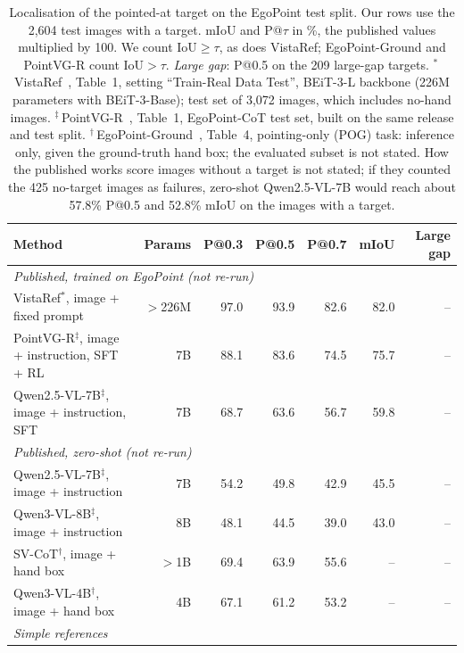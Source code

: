 \begin{table}[h]
  \caption{Localisation of the pointed-at target on the EgoPoint test split. Our rows use the 2,604 test images with a target. mIoU and P@$\tau$ in \%, the published values multiplied by 100. We count IoU${\geq}\tau$, as does VistaRef; EgoPoint-Ground and PointVG-R count IoU${>}\tau$. \emph{Large gap}: P@0.5 on the 209 large-gap targets.
  $^\ast$\,VistaRef~\cite{li2026vistaref}, Table~1, setting ``Train-Real Data Test'', BEiT-3-L backbone (226M parameters with BEiT-3-Base); test set of 3,072 images, which includes no-hand images.
  $^\ddagger$\,PointVG-R~\cite{li2026pointvgr}, Table~1, EgoPoint-CoT test set, built on the same release and test split.
  $^\dagger$\,EgoPoint-Ground~\cite{egopoint}, Table~4, pointing-only (POG) task: inference only, given the ground-truth hand box; the evaluated subset is not stated.
  How the published works score images without a target is not stated; if they counted the 425 no-target images as failures, zero-shot Qwen2.5-VL-7B would reach about 57.8\% P@0.5 and 52.8\% mIoU on the images with a target.}
  \label{tab:main-full}
  \footnotesize
  \setlength{\tabcolsep}{3.4pt}
  \begin{tabular}{lrrrrrr}
    \toprule
    Method & Params & P@0.3 & P@0.5 & P@0.7 & mIoU & Large gap \\
    \midrule
    \multicolumn{7}{l}{\emph{Published, trained on EgoPoint (not re-run)}} \\
    \quad VistaRef$^\ast$, image + fixed prompt & $>$226M & 97.0 & 93.9 & 82.6 & 82.0 & -- \\
    \quad PointVG-R$^\ddagger$, image + instruction, SFT + RL & 7B & 88.1 & 83.6 & 74.5 & 75.7 & -- \\
    \quad Qwen2.5-VL-7B$^\ddagger$, image + instruction, SFT & 7B & 68.7 & 63.6 & 56.7 & 59.8 & -- \\
    \multicolumn{7}{l}{\emph{Published, zero-shot (not re-run)}} \\
    \quad Qwen2.5-VL-7B$^\ddagger$, image + instruction & 7B & 54.2 & 49.8 & 42.9 & 45.5 & -- \\
    \quad Qwen3-VL-8B$^\ddagger$, image + instruction & 8B & 48.1 & 44.5 & 39.0 & 43.0 & -- \\
    \quad SV-CoT$^\dagger$, image + hand box & $>$1B & 69.4 & 63.9 & 55.6 & -- & -- \\
    \quad Qwen3-VL-4B$^\dagger$, image + hand box & 4B & 67.1 & 61.2 & 53.2 & -- & -- \\
    \multicolumn{7}{l}{\emph{Simple references}} \\

\end{tabular}
\end{table}
